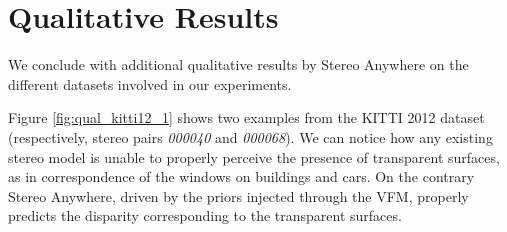 \documentclass[10pt,twocolumn,letterpaper]{article}
\newcommand{\method}[0]{Stereo Anywhere\xspace}
\begin{document}
\clearpage


\phantom{Invisible Text}
\vspace{-\baselineskip}

\section{Qualitative Results}

\label{subsec:qual}

We conclude with additional qualitative results by \method on the different datasets involved in our experiments.

Figure \ref{fig:qual_kitti12_1} shows two examples from the KITTI 2012 dataset (respectively, stereo pairs \textit{000040} and \textit{000068}). We can notice how any existing stereo model is unable to properly perceive the presence of transparent surfaces, as in correspondence of the windows on buildings and cars. On the contrary \method{}, driven by the priors injected through the VFM, properly predicts the disparity corresponding to the transparent surfaces.
\end{document}
